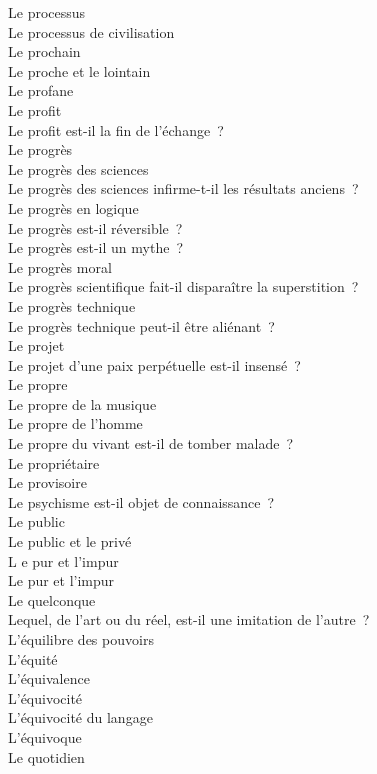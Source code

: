 \documentclass[a4paper,12pt]{article}
\begin{document}
Le processus \\
Le processus de civilisation \\
Le prochain \\
Le proche et le lointain \\
Le profane \\
Le profit \\
Le profit est-il la fin de l'échange ? \\
Le progrès \\
Le progrès des sciences \\
Le progrès des sciences infirme-t-il les résultats anciens ? \\
Le progrès en logique \\
Le progrès est-il réversible ? \\
Le progrès est-il un mythe ? \\
Le progrès moral \\
Le progrès scientifique fait-il disparaître la superstition ? \\
Le progrès technique \\
Le progrès technique peut-il être aliénant ? \\
Le projet \\
Le projet d'une paix perpétuelle est-il insensé ? \\
Le propre \\
Le propre de la musique \\
Le propre de l'homme \\
Le propre du vivant est-il de tomber malade ? \\
Le propriétaire \\
Le provisoire \\
Le psychisme est-il objet de connaissance ? \\
Le public \\
Le public et le privé \\
L e pur et l'impur \\
Le pur et l'impur \\
Le quelconque \\
Lequel, de l'art ou du réel, est-il une imitation de l'autre ? \\
L'équilibre des pouvoirs \\
L'équité \\
L'équivalence \\
L'équivocité \\
L'équivocité du langage \\
L'équivoque \\
Le quotidien \\
\end{document}
